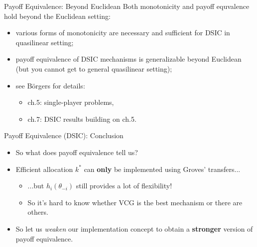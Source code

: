 \documentclass[english,10pt
,aspectratio=169
]{beamer}
\begin{document}
\begin{frame}{Payoff Equivalence: Beyond Euclidean}
	Both monotonicity and payoff equvalence hold beyond the Euclidean setting:
	\begin{itemize}
		\item various forms of \alert{monotonicity} are necessary and sufficient for DSIC in quasilinear setting;
		\item \alert{payoff equivalence} of DSIC mechanisms is generalizable beyond Euclidean (but you cannot get to general quasilinear setting);
		\item see B{\"o}rgers for details:
		\begin{itemize}
			\item ch.5: single-player problems,
			\item ch.7: DSIC results building on ch.5.
		\end{itemize}
	\end{itemize}
\end{frame}


\begin{frame}{Payoff Equivalence (DSIC): Conclusion}
	\begin{itemize}
		\item So what does payoff equivalence tell us?
		\item Efficient allocation $k^*$ can \textbf{only} be implemented using Groves' transfers...
		\begin{itemize}
			\item ...but $h_i(\theta_{-i})$ still provides a lot of flexibility!
			\item So it's hard to know whether VCG is the best mechanism or there are others.
		\end{itemize}
		\item So let us \emph{weaken} our implementation concept to obtain a \textbf{stronger} version of payoff equivalence.
	\end{itemize}
\end{frame}
\end{document}

